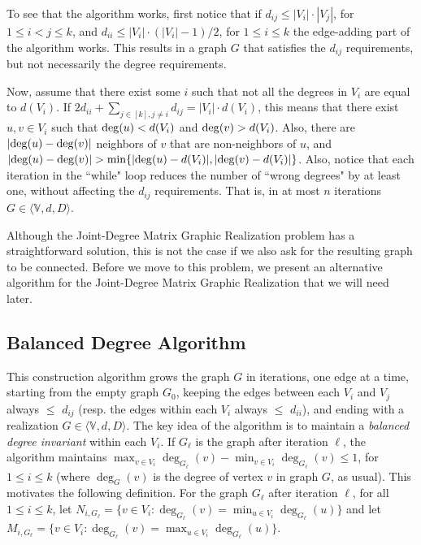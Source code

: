 \documentclass[12pt,a4paper]{article}
\theoremstyle{definition}
\theoremstyle{plain}
\begin{document}
To see that the algorithm works, first notice that if 
$d_{ij} \leq |V_i|\cdot|V_j|$, for $ 1 \leq i < j \leq k$,
and
$d_{ii} \leq |V_i|\cdot(|V_i|\! - \! 1)/2$, for $ 1 \leq i \leq k$
the edge-adding part of the algorithm works. This results in a graph 
$G$ that satisfies the $d_{ij}$ requirements, but not necessarily 
the degree requirements. 

Now, assume that there exist some $i$ such that
not all the degrees in $V_i$ are equal to $d(V_i)$. If 
$2d_{ii} \! + \! \sum_{j \in [k],j\neq i} d_{ij} =
|V_i| \cdot d(V_i)$, this means that there exist 
$u,v \in V_i$ such that ${\rm deg}(u)< d(V_i)$
and ${\rm deg}(v)> d(V_i)$. Also, there are $|{\rm deg}(u)-{\rm deg}(v)|$
neighbors of $v$ that are non-neighbors of $u$, and 
$|{\rm deg}(u)-{\rm deg}(v)|>\min \{|{\rm deg}(u)-d(V_i)|,|{\rm deg}(v)-d(V_i)|\}$.
Also, notice that each iteration in the ``while" loop reduces 
the number of ``wrong degrees" by at least one, without affecting 
the $d_{ij}$ requirements. That is, in at most $n$ iterations
$G \in \langle{\mathbb V},d,D\rangle$.\medskip

Although the Joint-Degree Matrix Graphic Realization problem has a
straightforward solution, this is not the case if we also ask for the resulting 
graph to be connected. Before we move to this problem, we  present an 
alternative algorithm for the Joint-Degree Matrix Graphic Realization
that we will need later.



\subsection*{Balanced Degree Algorithm}



\label{sec:BalancedDegreeAlgorithm}

This construction algorithm grows the graph $G$
in iterations, one edge at a time, starting from the empty graph $G_0$,
keeping the edges between each $V_i$ and $V_j$ always $\leq$ $d_{ij}$
(resp. the edges within each $V_i$ always $\leq$ $d_{ii}$),
and ending with a realization $G \in
\langle{\mathbb V},d,D\rangle$.
The key idea of the algorithm is to
maintain a {\it balanced degree invariant}
within each $V_i$.
If $G_{\ell}$ is the graph after iteration ${\ell}$,
the algorithm maintains 
$\max_{v\in V_i} \deg_{G_{\ell}}(v) - 
\min_{v\in V_i} \deg_{G_{\ell}}(v) \leq 1$,
for $1 \leq i \leq k$ (where $\deg_G(v)$ is the
degree of vertex $v$ in graph $G$, as usual).
This motivates the following definition.
For the graph $G_{\ell}$ after iteration $\ell$,
for all $1 \leq i \leq k$, 
let $N_{i,G_{\ell}} \! =  \! \{ v\in V_i :
\deg_{G_{\ell}}(v) = \min_{u\in V_i} \deg_{G_{\ell}}(u)  \}$
and let $M_{i,G_{\ell}} \! =  \! \{ v\in V_i :
\deg_{G_{\ell}}(v) = \max_{u\in V_i} \deg_{G_{\ell}}(u)  \}$.
\end{document}

